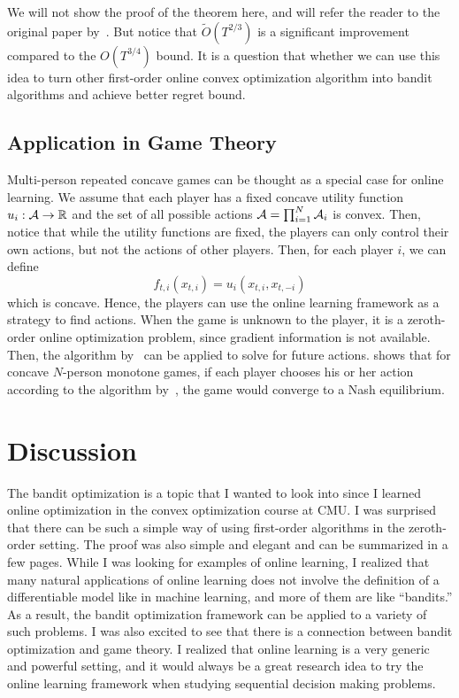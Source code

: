 \documentclass[11pt]{article}
\begin{document}
We will not show the proof of the theorem here, and will refer the reader to the original paper by~\cite{saha2011improved}. But notice that $\tilde{O}(T^{2/3})$ is a significant improvement compared to the $O(T^{3/4})$ bound. It is a question that whether we can use this idea to turn other first-order online convex optimization algorithm into bandit algorithms and achieve better regret bound.

\subsection{Application in Game Theory}
Multi-person repeated concave games can be thought as a special case for online learning. We assume that each player has a fixed concave utility function $u_i : \mathcal{A} \to \mathbb{R}$ and the set of all possible actions $\mathcal{A} = \prod_{i=1}^N \mathcal{A}_i$ is convex. Then, notice that while the utility functions are fixed, the players can only control their own actions, but not the actions of other players. Then, for each player $i$, we can define
\[
    f_{t,i}(x_{t,i}) = u_i(x_{t,i}, x_{t,-i})
\]
which is concave. Hence, the players can use the online learning framework as a strategy to find actions.
When the game is unknown to the player, it is a zeroth-order online optimization problem, since gradient information is not available. Then, the algorithm by~\cite{flaxman2005online} can be applied to solve for future actions.
\cite{bravo2018bandit} shows that for concave $N$-person monotone games, if each player chooses his or her action according to the algorithm by~\cite{flaxman2005online}, the game would converge to a Nash equilibrium.

\section{Discussion}
The bandit optimization is a topic that I wanted to look into since I learned online optimization in the convex optimization course at CMU.
I was surprised that there can be such a simple way of using first-order algorithms in the zeroth-order setting.
The proof was also simple and elegant and can be summarized in a few pages.
While I was looking for examples of online learning, I realized that many natural applications of online learning does not involve the definition of a differentiable model like in machine learning, and more of them are like ``bandits.''
As a result, the bandit optimization framework can be applied to a variety of such problems.
I was also excited to see that there is a connection between bandit optimization and game theory.
I realized that online learning is a very generic and powerful setting, and it would always be a great research idea to try the online learning framework when studying sequential decision making problems.
\end{document}
